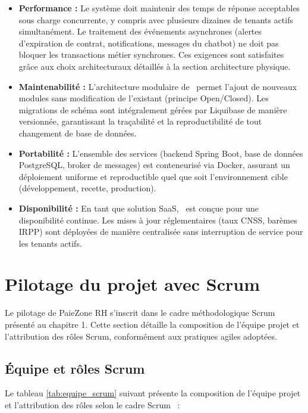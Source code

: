 \begin{itemize}[label=\textbullet, leftmargin=*, itemsep=6pt, topsep=6pt, parsep=0pt]
    \item \textbf{Performance :} Le système doit maintenir des temps de réponse acceptables sous charge concurrente, y compris avec
    plusieurs dizaines de tenants actifs simultanément. Le traitement des événements asynchrones (alertes d'expiration
    de contrat, notifications, messages du chatbot) ne doit pas bloquer les transactions métier synchrones. Ces
    exigences sont satisfaites grâce aux choix architecturaux détaillés à la section architecture physique.
    \item \textbf{Maintenabilité :} L'architecture modulaire de \pz\ permet l'ajout de nouveaux modules sans modification de l'existant (principe Open/Closed). Les migrations de schéma sont intégralement gérées par Liquibase de manière versionnée, garantissant la traçabilité et la reproductibilité de tout changement de base de données.
    
    \item \textbf{Portabilité :} L'ensemble des services (backend Spring Boot, base de données PostgreSQL, broker de messages) est conteneurisé via Docker, assurant un déploiement uniforme et reproductible quel que soit l'environnement cible (développement, recette, production).
    
    \item \textbf{Disponibilité :} En tant que solution SaaS, \pz\ est conçue pour une disponibilité continue. Les mises à jour réglementaires (taux CNSS, barèmes IRPP) sont déployées de manière centralisée sans interruption de service pour les tenants actifs.
\end{itemize}


\section{Pilotage du projet avec Scrum}\label{sec:scrum_pilotage}
Le pilotage de PaieZone RH s'inscrit dans le cadre méthodologique Scrum présenté au chapitre 1. Cette section
détaille la composition de l'équipe projet et l'attribution des rôles Scrum, conformément aux pratiques agiles
adoptées.

\subsection{Équipe et rôles Scrum}

Le tableau \ref{tab:equipe_scrum} suivant présente la composition de l'équipe projet et l'attribution des rôles selon le cadre Scrum~\cite{scrum} :

